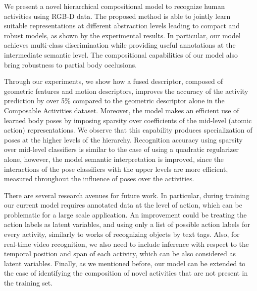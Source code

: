 We present a novel hierarchical compositional model to recognize
human activities using RGB-D data. The proposed method
is able to jointly learn suitable representations at different abstraction
levels leading to compact and robust models, as shown by the experimental
results. In particular, our model 
achieves multi-class discrimination while
providing useful annotations at the intermediate semantic level.
The compositional capabilities of our model also bring robustness to partial
body occlusions.

Through our experiments, we show how a fused descriptor, composed of geometric
features and motion descriptors, improves the accuracy of the
activity prediction by over 5\% compared to the geometric descriptor alone in
the Composable Activities dataset. Moreover, the model makes an efficient use of
learned body poses by imposing sparsity over coefficients of the mid-level
(atomic action) representations. We observe that this capability produces
specialization of poses at the higher levels of the hierarchy. Recognition
accuracy using sparsity over mid-level classifiers is similar to the case of
using a quadratic regularizer alone, however, the model semantic interpretation
is improved, since the interactions of the pose classifiers with the upper
levels are more efficient, measured throughout the influence of poses over the
activities.

There are several research avenues for future work. In particular, during
training our current model requires annotated data at the level of action,
which can be problematic for a large scale application. An improvement could be
treating the action labels as latent variables, and using only a list of
possible action labels for every activity, similarly to works of recognizing
objects by text tags. Also, for real-time video recognition, we also need to
include inference with respect to the temporal position and span of each
activity, which can be also considered as latent variables. Finally, as we
mentioned before, our model can be extended to the case of identifying the
composition of novel activities that are not present in the training set. 

